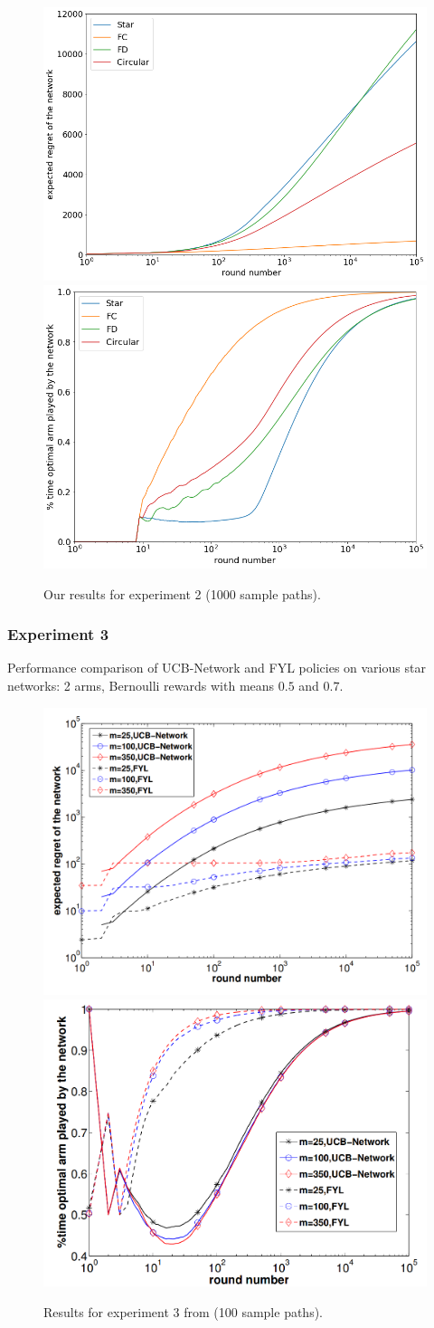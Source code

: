 \documentclass{article}
\begin{document}
\begin{figure}[H]
  \centering
  \includegraphics[width=0.49\linewidth]{fig2_1_ours.png}
  \includegraphics[width=0.49\linewidth]{fig2_2_ours.png}
  \caption{Our results for experiment 2 (1000 sample paths).}
\end{figure}

\subsubsection{Experiment 3}

Performance comparison of UCB-Network and FYL policies on various star networks: 2 arms, Bernoulli rewards with means $0.5$ and $0.7$.

\begin{figure}[H]
  \centering
  \includegraphics[width=0.49\linewidth]{fig3_1.png}
  \includegraphics[width=0.49\linewidth]{fig3_2.png}
  \caption{Results for experiment 3 from \cite{DBLP:journals/corr/KollaJG16} (100 sample paths).}
\end{figure}
\end{document}
